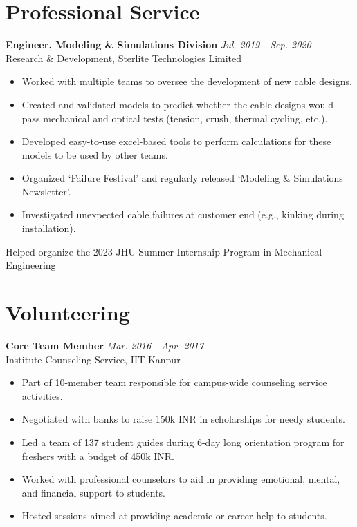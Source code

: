 \documentclass[11pt]{article}
\begin{document}
\vspace{6mm}

\section*{Professional Service}

\noindent\textbf{Engineer, Modeling \& Simulations Division} \hfill \textit{Jul. 2019 - Sep. 2020} \\
Research \& Development, Sterlite Technologies Limited
\begin{itemize}[leftmargin=*,itemsep=1pt]
    \item Worked with multiple teams to oversee the development of new cable designs.
    \item Created and validated models to predict whether the cable designs would pass mechanical and optical tests (tension, crush, thermal cycling, etc.).
    \item Developed easy-to-use excel-based tools to perform calculations for these models to be used by other teams.
    \item Organized ‘Failure Festival’ and regularly released ‘Modeling \& Simulations Newsletter’.
    \item Investigated unexpected cable failures at customer end (e.g., kinking during installation).
\end{itemize}

\vspace{4mm}

\noindent Helped organize the 2023 JHU Summer Internship Program in Mechanical Engineering

\vspace{6mm}

\section*{Volunteering}

\noindent\textbf{Core Team Member} \hfill \textit{Mar. 2016 - Apr. 2017} \\
Institute Counseling Service, IIT Kanpur
\begin{itemize}[leftmargin=*,itemsep=1pt]
    \item Part of 10-member team responsible for campus-wide counseling service activities.
    \item Negotiated with banks to raise 150k INR in scholarships for needy students.
    \item Led a team of 137 student guides during 6-day long orientation program for freshers with a budget of 450k INR.
    \item Worked with professional counselors to aid in providing emotional, mental, and financial support to students.
    \item Hosted sessions aimed at providing academic or career help to students.
\end{itemize}
\end{document}
